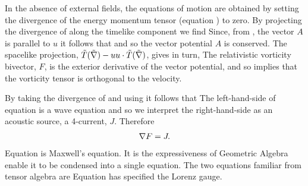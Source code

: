 In the absence of external fields, the equations of motion are obtained by setting the 
 divergence of the energy momentum tensor (equation ) to zero.
By projecting the divergence of  along the timelike component we find
Since, from , the vector $A$ is parallel to $u$  it follows that 
and so the vector potential $A$ is conserved.
The spacelike projection,
$\tilde{T}(\tilde{\nabla}) - u u\cdot \tilde{T}(\tilde{\nabla})$, gives in turn,
The relativistic vorticity bivector, $F$, is the exterior derivative  of the vector potential, 
and so  implies that the vorticity tensor is orthogonal to the velocity.

By taking the divergence of  and using  it follows that 
The left-hand-side of equation  is a wave equation and so we interpret the right-hand-side as an acoustic source,
a 4-current, $J$.
Therefore 
\begin{align}
\label{eqn:Maxwell}
\nabla F =J.
\end{align}
Equation  is Maxwell's equation. 
It is the expressiveness of Geometric Algebra enable it to be condensed into a single equation.
The two equations familiar from tensor algebra are 
Equation  has specified the Lorenz gauge.

